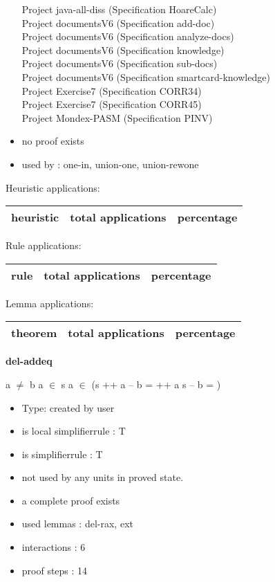 \documentclass[a4paper]{article}
\begin{document}
\begin{itemize}
Project java-all-diss (Specification HoareCalc) \\
Project documentsV6 (Specification add-doc) \\
Project documentsV6 (Specification analyze-docs) \\
Project documentsV6 (Specification knowledge) \\
Project documentsV6 (Specification sub-docs) \\
Project documentsV6 (Specification smartcard-knowledge) \\
Project Exercise7 (Specification CORR34) \\
Project Exercise7 (Specification CORR45) \\
Project Mondex-PASM (Specification PINV)
\item       no proof exists
\item       used by      : one-in, union-one, union-rewone
\end{itemize}

\medskip


Heuristic applications:

\begin{supertabular}{l|r|r}
heuristic	& total applications & percentage \\ \hline

\end{supertabular}

Rule applications:

\begin{supertabular}{l|r|r}
rule	        & total applications & percentage \\ \hline

\end{supertabular}

Lemma applications:

\begin{supertabular}{l|r|r}
theorem	        & total applications & percentage \\ \hline

\end{supertabular}
\pagebreak

{\LARGE\bf del-addeq}\label{lemma-del-addeq}

\medskip

 \Fol a $\neq$ b \And \Not a $\in$ s \And \Not a $\in$  \Imp (s ++ a -- b =  ++ a \Equiv s -- b = )

\begin{itemize}

\item Type: created by user

\item is local simplifierrule : T
\item is simplifierrule : T
\item not used by any units in proved state.
\item       a complete proof exists
\item       used lemmas  : del-rax, ext
\item       interactions : 6
\item       proof steps  : 14
\end{itemize}
\end{document}
